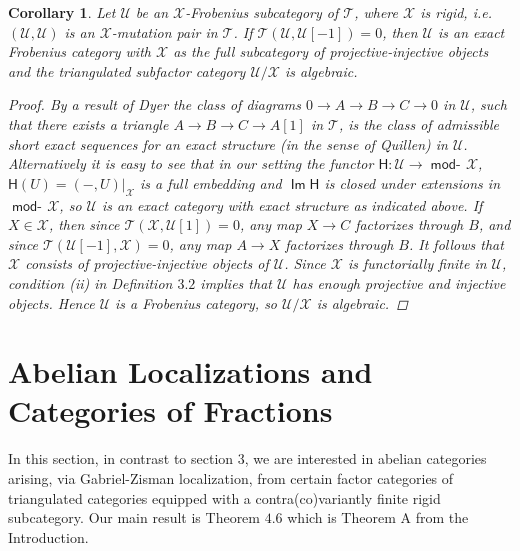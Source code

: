 \documentclass[oneside, a4paper,reqno]{amsart}
\numberwithin{equation}{section}
\newtheorem{cor}[thm]{Corollary}
\theoremstyle{definition}
\begin{document}
\begin{cor}  Let ${\mathcal U}$ be an ${\mathcal X}$-Frobenius subcategory of ${\mathcal T}$, where ${\mathcal X}$ is rigid, i.e. $({\mathcal U},{\mathcal U})$ is an ${\mathcal X}$-mutation pair in ${\mathcal T}$. If ${\mathcal T}({\mathcal U},{\mathcal U}[-1]) = 0$, then ${\mathcal U}$ is an exact Frobenius category with ${\mathcal X}$ as the full subcategory of projective-injective objects and the triangulated subfactor category ${\mathcal U}/{\mathcal X}$ is algebraic. 
\begin{proof} By a result of Dyer \cite{Dyer} the class of diagrams $0 {\longrightarrow} A {\longrightarrow} B {\longrightarrow} C {\longrightarrow} 0$ in ${\mathcal U}$, such that there exists a triangle  $A {\longrightarrow} B {\longrightarrow} C {\longrightarrow} A[1]$ in ${\mathcal T}$, is the class of admissible short exact sequences for an exact structure (in the sense of Quillen) in ${\mathcal U}$. Alternatively it is easy to see that in our setting the functor $\mathsf{H} \colon {\mathcal U} {\longrightarrow} \operatorname*{\mathsf{mod}-\!}{\mathcal X}$, $\mathsf{H}(U) = (-,U)|_{\mathcal X}$ is a full embedding and $\operatorname*{\mathsf{Im}}\mathsf{H}$ is closed under extensions in $\operatorname*{\mathsf{mod}-\!}{\mathcal X}$, so ${\mathcal U}$ is an exact category with exact structure as indicated above. If $X \in {\mathcal X}$, then since ${\mathcal T}({\mathcal X},{\mathcal U}[1]) = 0$, any map $X {\longrightarrow} C$ factorizes through $B$, and since ${\mathcal T}({\mathcal U}[-1],{\mathcal X}) = 0$, any map $A {\longrightarrow} X$ factorizes through $B$. It follows that ${\mathcal X}$ consists of projective-injective objects of ${\mathcal U}$. Since ${\mathcal X}$ is functorially finite in ${\mathcal U}$, condition (ii) in Definition $3.2$ implies that ${\mathcal U}$ has enough projective and injective objects. Hence ${\mathcal U}$ is a Frobenius category, so   ${\mathcal U}/{\mathcal X}$ is algebraic.  
\end{proof}  
\end{cor} 

\section{Abelian Localizations and Categories of Fractions} 

In this section, in contrast to section 3,  we are interested in abelian categories arising, via Gabriel-Zisman localization, from certain factor categories of triangulated categories equipped with a contra(co)variantly  finite rigid subcategory. Our main result is Theorem $4.6$ which is Theorem A from the Introduction.
\end{document}
